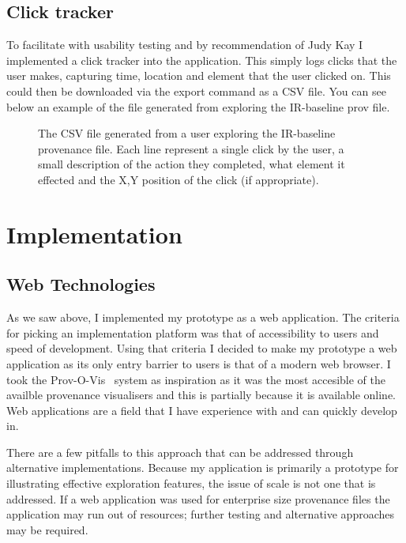 \subsection{Click tracker}
\label{sec:click_tracker}

To facilitate with usability testing and by recommendation of Judy Kay I implemented a click tracker into the application. This simply logs clicks that the user makes, capturing time, location and element that the user clicked on. This could then be downloaded via the export command as a CSV file.  You can see below an example of the file generated from exploring the IR-baseline prov file.


\begin{figure}[h]
	\centering
	
	\caption{The CSV file generated from a user exploring the IR-baseline provenance file. Each line represent a single click by the user, a small description of the action they completed, what element it effected and the X,Y position of the click (if appropriate).}
	\label{fig:clickfile}
\end{figure}

\section{Implementation}

\subsection{Web Technologies}
\label{sec:web_technologies}

As we saw above, I implemented my prototype as a web application. The criteria for picking an implementation platform was that of accessibility to users and speed of development. Using that criteria I decided to make my prototype a web application as its only entry barrier to users is that of a modern web browser. I took the Prov-O-Vis~\cite{Hoekstra2014} system as inspiration as it was the most accesible of the availble provenance visualisers and this is partially because it is available online. Web applications are a field that I have experience with and can quickly develop in. 

There are a few pitfalls to this approach that can be addressed through alternative implementations. Because my application is primarily a prototype for illustrating effective exploration features, the issue of scale is not one that is addressed. If a web application was used for enterprise size provenance files the application may run out of resources; further testing and alternative approaches may be required.


